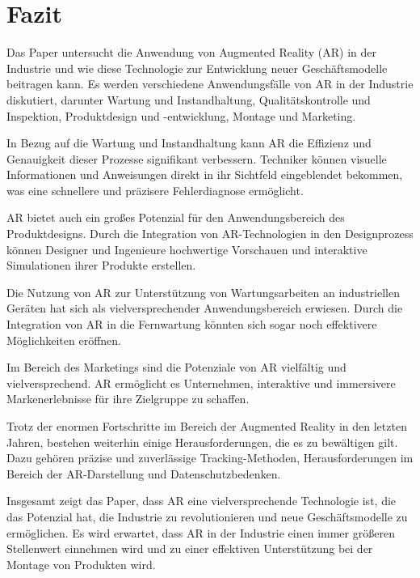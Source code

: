 \section{Fazit}
Das Paper untersucht die Anwendung von Augmented Reality (AR) in der Industrie
und wie diese Technologie zur Entwicklung neuer Geschäftsmodelle beitragen
kann. Es werden verschiedene Anwendungsfälle von AR in der Industrie
diskutiert, darunter Wartung und Instandhaltung, Qualitätskontrolle und
Inspektion, Produktdesign und -entwicklung, Montage und Marketing.

In Bezug auf die Wartung und Instandhaltung kann AR die Effizienz und
Genauigkeit dieser Prozesse signifikant verbessern. Techniker können visuelle
Informationen und Anweisungen direkt in ihr Sichtfeld eingeblendet bekommen,
was eine schnellere und präzisere Fehlerdiagnose ermöglicht.

AR bietet auch ein großes Potenzial für den Anwendungsbereich des
Produktdesigns. Durch die Integration von AR-Technologien in den Designprozess
können Designer und Ingenieure hochwertige Vorschauen und interaktive
Simulationen ihrer Produkte erstellen.

Die Nutzung von AR zur Unterstützung von Wartungsarbeiten an industriellen
Geräten hat sich als vielversprechender Anwendungsbereich erwiesen. Durch die
Integration von AR in die Fernwartung könnten sich sogar noch effektivere
Möglichkeiten eröffnen.

Im Bereich des Marketings sind die Potenziale von AR vielfältig und
vielversprechend. AR ermöglicht es Unternehmen, interaktive und immersivere
Markenerlebnisse für ihre Zielgruppe zu schaffen.

Trotz der enormen Fortschritte im Bereich der Augmented Reality in den letzten
Jahren, bestehen weiterhin einige Herausforderungen, die es zu bewältigen gilt.
Dazu gehören präzise und zuverlässige Tracking-Methoden, Herausforderungen im
Bereich der AR-Darstellung und Datenschutzbedenken.

Insgesamt zeigt das Paper, dass AR eine vielversprechende Technologie ist, die
das Potenzial hat, die Industrie zu revolutionieren und neue Geschäftsmodelle
zu ermöglichen. Es wird erwartet, dass AR in der Industrie einen immer größeren
Stellenwert einnehmen wird und zu einer effektiven Unterstützung bei der
Montage von Produkten wird.